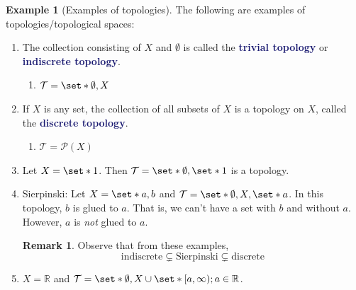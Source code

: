 \documentclass[11pt]{article}
\numberwithin{equation}{section}
\newcommand{\navy}[1]{\textcolor{MidnightBlue}{\bf #1}}
\newcounter{theo}[section]\setcounter{theo}{0}
\theoremstyle{definition}
\theoremstyle{definition}
\newtheorem{example}{\color{WildStrawberry}Example}[section]
\newtheorem*{remark}{Remark}
\def\Set{\set*}%
\newcommand{\1}{\mathbbm 1}
\newcommand{\RR}{\mathbb R}
\newcommand{\pP}{\mathcal P}
\newcommand{\tT}{\mathcal T}
\begin{document}
\begin{example}[Examples of topologies]
The following are examples of topologies/topological spaces:
\begin{enumerate}
	\item The collection consisting of $X$ and $\emptyset$ is called the \navy{trivial topology} or \navy{indiscrete topology}. 
	\begin{enumerate}
		\item $\tT = \Set{\emptyset, X}$
	\end{enumerate}
	\item If $X$ is any set, the collection of all subsets of $X$ is a topology on $X$, called the \navy{discrete topology}.
	\begin{enumerate}
		\item $\tT = \pP(X)$
	\end{enumerate}
	\item Let $X = \Set{1}$. Then $\tT = \Set{\emptyset, \Set{1}}$ is a topology.
	\item Sierpinski: Let $X = \Set{a,b}$ and $\tT = \Set{\emptyset, X, \Set{a}}$. In this topology, $b$ is glued to $a$. That is, we can't have a set with $b$ and without $a$. However, $a$ is \emph{not} glued to $a$. 
	\begin{remark}
	Observe that from these examples,
	\begin{equation*}
		\text{indiscrete} \subsetneq \text{Sierpinski} \subsetneq \text{discrete}
	\end{equation*}
	\end{remark}	
	\item $X = \RR$ and $\tT = \Set{\emptyset, X} \cup \Set{[a,\infty); a \in \RR}$.
\end{enumerate}
\end{example}



\end{document}
